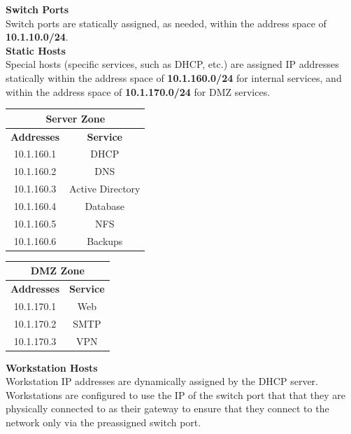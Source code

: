 \noindent
\textbf{Switch Ports} \\
Switch ports are statically assigned, as needed, within the address space of 
\textbf{10.1.10.0/24}. \\

\noindent
\textbf{Static Hosts} \\
Special hosts (specific services, such as DHCP, etc.) are assigned IP addresses 
statically within the address space of \textbf{10.1.160.0/24} for internal 
services, and within the address space of \textbf{10.1.170.0/24} for DMZ 
services. \\

\begin{center}
	\begin{tabular}[m]{| c | c |}
		\hline
		\multicolumn{2}{|c|}{Server Zone}\\
		\hline
		\textbf{Addresses} & \textbf{Service}\\
		\hline
		10.1.160.1 & DHCP \\
		\hline
		10.1.160.2 & DNS \\
		\hline
		10.1.160.3 & Active Directory \\
		\hline
		10.1.160.4 & Database \\
		\hline
		10.1.160.5 & NFS \\
		\hline
		10.1.160.6 & Backups \\
		\hline
	\end{tabular}
\end{center}

\vspace{1em}


\begin{center}
	\begin{tabular}[m]{| c | c |}
		\hline
		\multicolumn{2}{|c|}{DMZ Zone}\\
		\hline
		\textbf{Addresses} & \textbf{Service}\\
		\hline
		10.1.170.1 & Web \\
		\hline
		10.1.170.2 & SMTP \\
		\hline
		10.1.170.3 & VPN \\
		\hline
	\end{tabular}
\end{center}

\vspace{1em}

\noindent
\textbf{Workstation Hosts} \\
Workstation IP addresses are dynamically assigned by the DHCP server. 
Workstations are configured to use the IP of the switch port that that they are
physically connected to as their gateway to ensure that they connect to the 
network only via the preassigned switch port. \\

